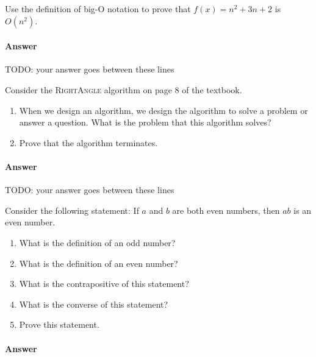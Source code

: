\documentclass{article}
\begin{document}
\nextprob
Use the definition of big-O notation to prove that $f(x)=n^2 + 3n +2$ is
$O(n^2)$.

\paragraph{Answer}


TODO: your answer goes between these lines




\nextprob
Consider the \textsc{RightAngle} algorithm on page 8 of the textbook.
\begin{enumerate}
    \item When we design an algorithm, we design the algorithm to solve a
        problem or answer a question.  What is the problem that this algorithm
        solves?
    \item Prove that the algorithm terminates.
\end{enumerate}

\paragraph{Answer}


TODO: your answer goes between these lines




\nextprob
Consider the following statement: If $a$ and $b$ are both even numbers, then $ab$ is
an even number.
\begin{enumerate}
    \item What is the definition of an odd number?
    \item What is the definition of an even number?
    \item What is the contrapositive of this statement?
    \item What is the converse of this statement?
    \item Prove this statement.
\end{enumerate}

\paragraph{Answer}
\end{document}
